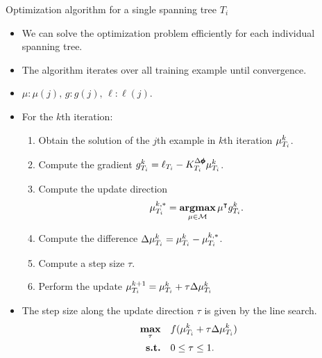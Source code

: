 \documentclass[first=dgreen,second=purple,logo=yellowexc]{aaltoslides}
\begin{document}
\begin{frame}{Optimization algorithm for a single spanning tree $T_i$}
	\begin{itemize}\footnotesize
		\item We can solve the optimization problem efficiently for each individual spanning tree. 
		\item The algorithm iterates over all training example until convergence.
		\item $\mu:\mu(j),\,g:g(j),\,\ell:\ell(j)$.
		\item For the $k$th iteration:
		\begin{enumerate}\footnotesize
			\item Obtain the solution of the $j$th example in $k$th iteration $\mathbf {\mu}_{T_i}^k$.
			\item Compute the gradient $g_{T_i}^k = \ell_{T_i} - K^{\Delta\pmb \phi}_{T_i}\mathbf {\mu}_{T_i}^k$.
			\item Compute the update direction 
			\begin{align*}
				{\mathbf {\mu}}_{T_i}^{k,*} = \underset{\mathbf {\mu}\in\mathcal{M}}{\textbf{argmax}}\,\mathbf {\mu}^{\intercal} g_{T_i}^k.
			\end{align*}
			\item Compute the difference $\Delta\mathbf {\mu}_{T_i}^{k} = {\mathbf {\mu}}_{T_i}^{k} - {\mathbf {\mu}}_{T_i}^{k,*}$.
			\item Compute a step size $\tau$.
			\item Perform the update $\mathbf {\mu}_{T_i}^{k+1} = \mathbf {\mu}_{T_i}^k + \tau\Delta\mathbf {\mu}_{T_i}^{k}$
		\end{enumerate}
		\item The step size along the update direction $\tau$ is given by the line search.
		\begin{align*}
			\underset{\tau}{\textbf{max}} &\quad f(\mathbf {\mu}_{T_i}^k + \tau\Delta\mathbf {\mu}_{T_i}^{k})\\
			\textbf{s.t.} &\quad 0\le\tau\le1.
		\end{align*}
	\end{itemize}
\end{frame}
\end{document}
